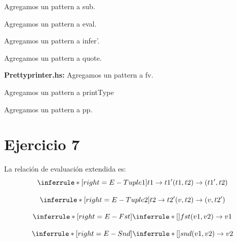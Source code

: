 \documentclass{article}
\begin{document}
	
	Agregamos un pattern a sub.
	
	Agregamos un pattern a eval.
	
	Agregamos un pattern a infer'.
	
	Agregamos un pattern a quote.
	
	\textbf{Prettyprinter.hs:} Agregamos un pattern a fv.
	
	Agregamos un pattern a printType
	
	Agregamos un pattern a pp.
	
	\newpage
	\section*{Ejercicio 7}
	La relación de evaluación extendida es:
	\[
	\inferrule* [right=E-Tuple1]
	{t1 \rightarrow t1' }
	{(t1,t2) \rightarrow (t1',t2)}
	\]
	
	\[
	\inferrule* [right=E-Tuple2]
	{t2 \rightarrow t2' }
	{(v,t2) \rightarrow (v,t2')}
	\]
	
	\[
		\inferrule* [right=E-Fst]
		{\inferrule* [] {}{  }}
		{fst(v1,v2) \rightarrow v1 }
	\]
	
	\[
		\inferrule* [right=E-Snd]
		{\inferrule* [] {}{    }}
		{snd(v1,v2) \rightarrow v2 }
	\] \\
	
	
\end{document}
